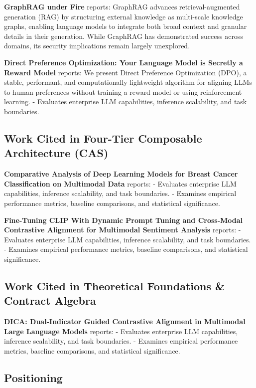 \documentclass[10pt,twocolumn,letterpaper]{article}
\begin{document}
\textbf{GraphRAG under Fire} \cite{arxiv_2501_14050} reports: GraphRAG advances retrieval-augmented generation (RAG) by structuring external knowledge as multi-scale knowledge graphs, enabling language models to integrate both broad context and granular details in their generation. While GraphRAG has demonstrated success across domains, its security implications remain largely unexplored.

\textbf{Direct Preference Optimization: Your Language Model is Secretly a Reward Model} \cite{arxiv_2305_18290} reports: We present Direct Preference Optimization (DPO), a stable, performant, and computationally lightweight algorithm for aligning LLMs to human preferences without training a reward model or using reinforcement learning. - Evaluates enterprise LLM capabilities, inference scalability, and task boundaries.


\subsection{Work Cited in Four-Tier Composable Architecture (CAS)}


\textbf{Comparative Analysis of Deep Learning Models for Breast Cancer Classification on Multimodal Data} \cite{crossref_10_1145_3689096_3689462} reports: - Evaluates enterprise LLM capabilities, inference scalability, and task boundaries. - Examines empirical performance metrics, baseline comparisons, and statistical significance.

\textbf{Fine-Tuning CLIP With Dynamic Prompt Tuning and Cross-Modal Contrastive Alignment for Multimodal Sentiment Analysis} \cite{crossref_10_1109_access_2026_3656309} reports: - Evaluates enterprise LLM capabilities, inference scalability, and task boundaries. - Examines empirical performance metrics, baseline comparisons, and statistical significance.


\subsection{Work Cited in Theoretical Foundations \& Contract Algebra}


\textbf{DICA: Dual-Indicator Guided Contrastive Alignment in Multimodal Large Language Models} \cite{crossref_10_18653_v1_2026_findings_acl_1933} reports: - Evaluates enterprise LLM capabilities, inference scalability, and task boundaries. - Examines empirical performance metrics, baseline comparisons, and statistical significance.


\subsection{Positioning}
\end{document}
